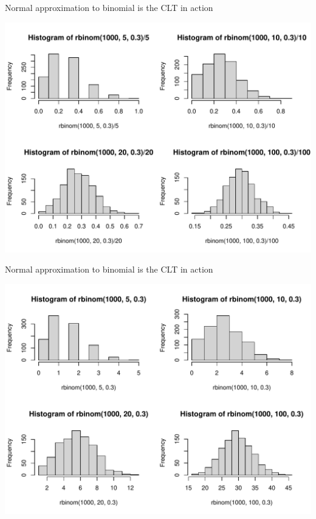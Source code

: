 \documentclass[10pt]{beamer}\usepackage[]{graphicx}\usepackage[]{color}
\makeatletter
\def\maxwidth{ %
  \ifdim\Gin@nat@width>\linewidth
    \linewidth
  \else
    \Gin@nat@width
  \fi
}
\newenvironment{knitrout}{}{} %
\makeatother
\begin{document}
\begin{frame}[fragile]{Normal approximation to binomial is the CLT in action}
\begin{knitrout}\tiny
{}\color{fgcolor}

{\centering \includegraphics[width=\maxwidth]{figure/unnamed-chunk-5-1} 

}



\end{knitrout}
\end{frame}


\begin{frame}[fragile]{Normal approximation to binomial is the CLT in action}
\begin{knitrout}\tiny
{}\color{fgcolor}

{\centering \includegraphics[width=\maxwidth]{figure/unnamed-chunk-6-1} 

}



\end{knitrout}
\end{frame}
\end{document}
